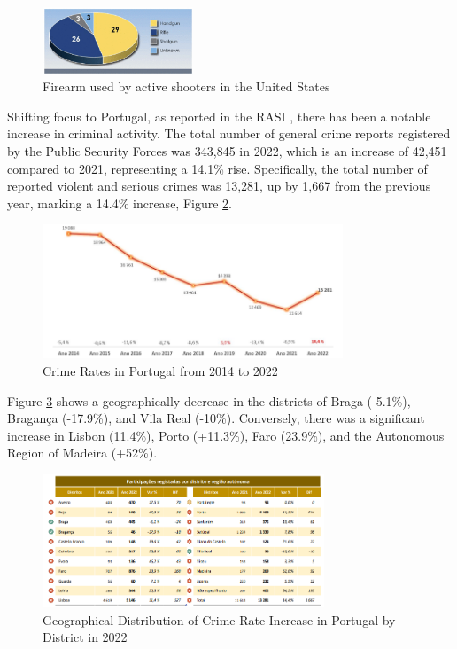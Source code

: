 \begin{figure}[h]
    \centering 
    \includegraphics[width=0.4\textwidth]{figs/firearms.png} 
    \caption{Firearm used by active shooters in the United States \cite{rfc37}}
    \label{fig:fbi-firearms}
\end{figure}

Shifting focus to Portugal, as reported in the RASI \cite{rfc41}, there has been a notable increase in criminal activity. The total number of general crime reports registered by the Public Security Forces was 343,845 in 2022, which is an increase of 42,451 compared to 2021, representing a 14.1\% rise. Specifically, the total number of reported violent and serious crimes was 13,281, up by 1,667 from the previous year, marking a 14.4\% increase, Figure \ref{fig:crimes-portugal}.

\begin{figure}[h]
    \centering 
    \includegraphics[width=0.8\textwidth]{figs/crimes-portugal.png} 
    \caption{Crime Rates in Portugal from 2014 to 2022 \cite{rfc41}}
    \label{fig:crimes-portugal}
\end{figure}

Figure \ref{fig:geo-crimes} shows a geographically decrease in the districts of Braga (-5.1\%), Bragança (-17.9\%), and Vila Real (-10\%). Conversely, there was a significant increase in Lisbon (11.4\%), Porto (+11.3\%), Faro (23.9\%), and the Autonomous Region of Madeira (+52\%).

\begin{figure}[h]
    \centering 
    \includegraphics[width=0.75\textwidth]{figs/geo-crimes-rate.png} 
    \caption{Geographical Distribution of Crime Rate Increase in Portugal by District in 2022 \cite{rfc41}}
    \label{fig:geo-crimes}
\end{figure}

